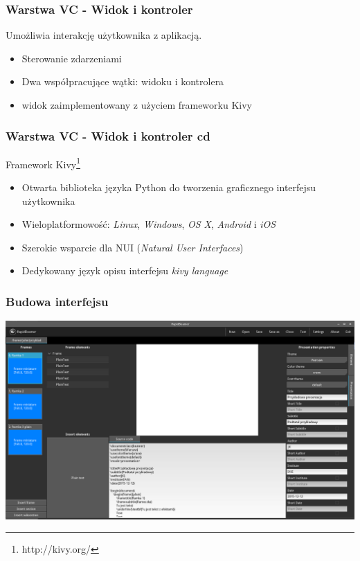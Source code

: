 \documentclass[t]{beamer}
\begin{document}
\begin{frame}
	\frametitle{Warstwa VC - Widok i kontroler}
	Umożliwia interakcję użytkownika z aplikacją.
	\begin{itemize}
		\item Sterowanie zdarzeniami
		\item Dwa współpracujące wątki: widoku i kontrolera
		\item widok zaimplementowany z użyciem frameworku Kivy
	\end{itemize}
\end{frame}

\begin{frame}
	\frametitle{Warstwa VC - Widok i kontroler cd}

	 Framework Kivy\footnote{http://kivy.org/}

	\begin{itemize}
		\item Otwarta biblioteka języka Python do tworzenia graficznego interfejsu użytkownika 
		\item Wieloplatformowość: \emph{Linux}, \emph{Windows}, \emph{OS X}, \emph{Android} i \emph{iOS}
		\item Szerokie wsparcie dla NUI (\emph{Natural User Interfaces})
		\item Dedykowany język opisu interfejsu \emph{kivy language}
	\end{itemize}
\end{frame}

\begin{frame}[plain]
	\frametitle{Budowa interfejsu}
	\hspace*{-11mm}
	\includegraphics[width=\paperwidth]{rapidbeamer.png}
\end{frame}
\end{document}
